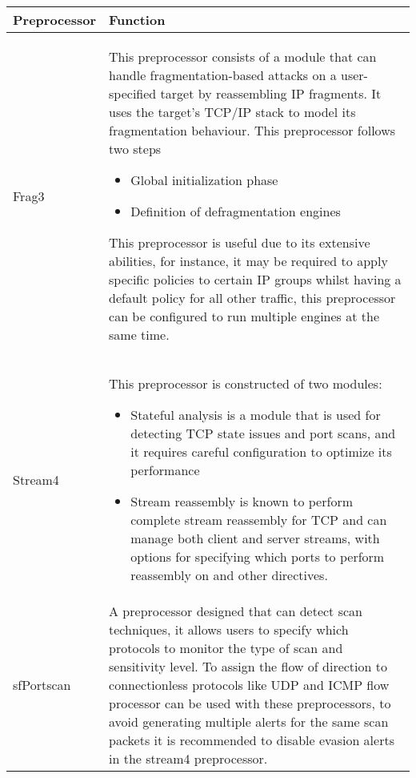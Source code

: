 \documentclass[12pt]{article}
\begin{document}
		\begin{center}
			\setlength{\tabcolsep}{10pt} %
			\renewcommand{\arraystretch}{1.5} %
			\begin{tabular}{ | m{3cm} | m{12cm}|  } 
				\hline
				Preprocessor & Function  \\ 
				
				\hline
				Frag3 & This preprocessor consists of a module that can handle fragmentation-based attacks on a user-specified target by reassembling IP fragments. It uses the target's TCP/IP stack to model its fragmentation behaviour. This preprocessor follows two steps 
				
				\begin{itemize}
					\item Global initialization phase
					\item Definition of defragmentation engines
				\end{itemize}
				
				This preprocessor is useful due to its extensive abilities, for instance, it may be required to apply specific policies to certain IP groups whilst having a default policy for all other traffic, this preprocessor can be configured to run multiple engines at the same time.
				
				\\ 
				\hline
				Stream4 & This preprocessor is constructed of two modules:
				\begin{itemize}
					\item  Stateful analysis is a module that is used for detecting TCP state issues and port scans, and it requires careful configuration to optimize its performance
					\item Stream reassembly is known to perform complete stream reassembly for TCP and can manage both client and server streams, with options for specifying which ports to perform reassembly on and other directives.
				\end{itemize}
				
				\\ 
				\hline
				sfPortscan & A preprocessor designed that can detect scan techniques, it allows users to specify which protocols to monitor the type of scan and sensitivity level.
				To assign the flow of direction to connectionless protocols like UDP and ICMP flow processor can be used with these preprocessors, to avoid generating multiple alerts for the same scan packets it is recommended to disable evasion alerts in the stream4 preprocessor.\\ 
				\hline
			\end{tabular}
		\end{center}
		
\end{document}
